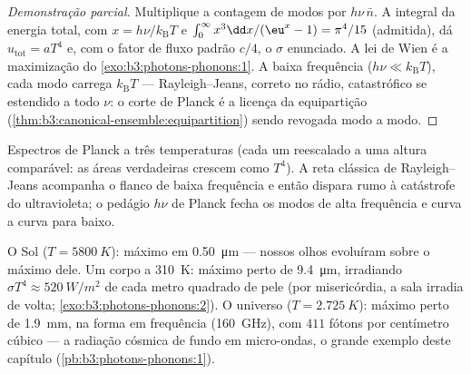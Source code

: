 \begin{proof}[Demonstração parcial]
Multiplique a contagem de modos por $h\nu\,\bar n$. A integral da
energia total, com $x = h\nu/k_{\text{B}}T$ e $\int_0^\infty
x^3\dd x/(\eu^x - 1) = \pi^4/15$ (admitida), dá $u_{\text{tot}}
= aT^4$ e, com o fator de fluxo padrão $c/4$, o $\sigma$
enunciado. A lei de Wien é a maximização do
\cref{exo:b3:photons-phonons:1}. A baixa frequência ($h\nu \ll
k_{\text{B}}T$), cada modo carrega $k_{\text{B}}T$ ---
Rayleigh--Jeans, correto no rádio, catastrófico se estendido a todo
$\nu$: o corte de Planck é a licença da equipartição
(\cref{thm:b3:canonical-ensemble:equipartition}) sendo revogada
modo a modo.
\end{proof}

\begin{omfigure}

{\small Espectros de Planck a três temperaturas (cada um reescalado a
uma altura comparável: as áreas verdadeiras crescem como $T^4$). A reta
clássica de Rayleigh--Jeans acompanha o flanco de baixa frequência e
então dispara rumo à catástrofe do ultravioleta; o pedágio $h\nu$ de
Planck fecha os modos de alta frequência e curva a curva para baixo.}
\end{omfigure}

\begin{example}\label{ex:b3:photons-phonons:thermometers}
O Sol ($T = \qty{5800}{K}$): máximo em \qty{0.50}{\micro m} ---
nossos olhos evoluíram sobre o máximo dele. Um corpo a \qty{310}{K}:
máximo perto de \qty{9.4}{\micro m}, irradiando $\sigma T^4 \approx
\qty{520}{W/m^2}$ de cada metro quadrado de pele (por misericórdia, a
sala irradia de volta;
\cref{exo:b3:photons-phonons:2}). O universo ($T =
\qty{2.725}{K}$): máximo perto de \qty{1.9}{mm}, na forma em frequência
(\qty{160}{GHz}), com $411$ fótons por centímetro cúbico ---
a radiação cósmica de fundo em micro-ondas, o grande exemplo deste
capítulo (\cref{pb:b3:photons-phonons:1}).
\end{example}


